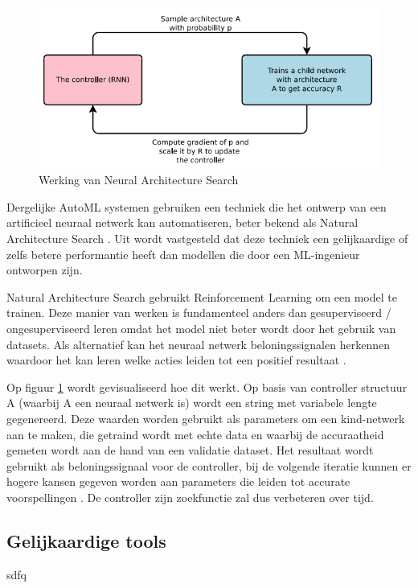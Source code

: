 \begin{figure}
    \includegraphics[width=\linewidth]{img/nas.png}
    \caption{Werking van Neural Architecture Search}
    \label{fig:nas}
\end{figure}

Dergelijke AutoML systemen gebruiken een techniek die het ontwerp van een artificieel neuraal netwerk kan automatiseren, beter bekend als Natural Architecture Search \autocite{Elsken2019}. Uit \textcite{ZophL2016} wordt vastgesteld dat deze techniek een gelijkaardige of zelfs betere performantie heeft dan modellen die door een ML-ingenieur ontworpen zijn.

Natural Architecture Search gebruikt Reinforcement Learning om een model te trainen. Deze manier van werken is fundamenteel anders dan gesuperviseerd / ongesuperviseerd leren omdat het model niet beter wordt door het gebruik van datasets. Als alternatief kan het neuraal netwerk beloningssignalen herkennen waardoor het kan leren welke acties leiden tot een positief resultaat \autocite{Lievens2019}.

Op figuur \ref{fig:nas} wordt gevisualiseerd hoe dit werkt. Op basis van controller structuur A (waarbij A een neuraal netwerk is) wordt een string met variabele lengte gegenereerd. Deze waarden worden gebruikt als parameters om een kind-netwerk aan te maken, die getraind wordt met echte data en waarbij de accuraatheid gemeten wordt aan de hand van een validatie dataset. Het resultaat wordt gebruikt als beloningssignaal voor de controller, bij de volgende iteratie kunnen er hogere kansen gegeven worden aan parameters die leiden tot accurate voorspellingen \autocite{ZophL2016}. De controller zijn zoekfunctie zal dus verbeteren over tijd.



\subsection{Gelijkaardige tools}
sdfq

